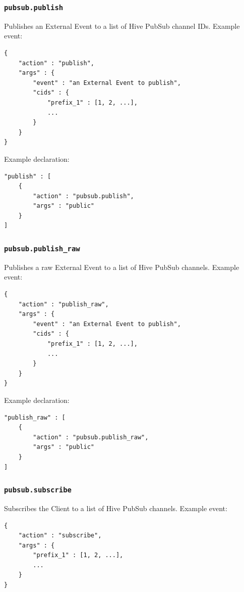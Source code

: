 \documentclass[a4paper]{article}
\begin{document}
\subsubsection{\texttt{pubsub.publish}}
\label{sec-9-3-10}

Publishes an External Event to a list of Hive PubSub channel IDs. Example event:


\begin{verbatim}
{
    "action" : "publish",
    "args" : {
        "event" : "an External Event to publish",
        "cids" : {
            "prefix_1" : [1, 2, ...],
            ...
        }
    }
}
\end{verbatim}




\noindent
Example declaration:

\begin{verbatim}
"publish" : [
    {
        "action" : "pubsub.publish",
        "args" : "public"
    }
]
\end{verbatim}
\subsubsection{\texttt{pubsub.publish\_raw}}
\label{sec-9-3-11}

Publishes a raw External Event to a list of Hive PubSub channels. Example event:


\begin{verbatim}
{
    "action" : "publish_raw",
    "args" : {
        "event" : "an External Event to publish",
        "cids" : {
            "prefix_1" : [1, 2, ...],
            ...
        }
    }
}
\end{verbatim}




\noindent
Example declaration:

\begin{verbatim}
"publish_raw" : [
    {
        "action" : "pubsub.publish_raw",
        "args" : "public"
    }
]
\end{verbatim}
\subsubsection{\texttt{pubsub.subscribe}}
\label{sec-9-3-12}

Subscribes the Client to a list of Hive PubSub channels. Example event:


\begin{verbatim}
{
    "action" : "subscribe",
    "args" : {
        "prefix_1" : [1, 2, ...],
        ...
    }
}
\end{verbatim}
\end{document}
